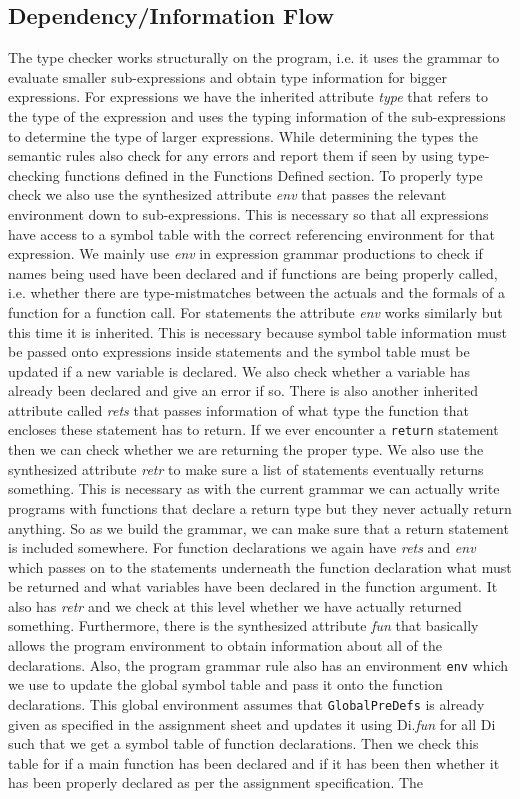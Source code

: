 \documentclass{article}
\begin{document}
\subsection{Dependency/Information Flow}
The type checker works structurally on the program, i.e. it uses the grammar to evaluate smaller sub-expressions and obtain type information for bigger expressions. For expressions we have the inherited attribute \textit{type} that refers to the type of the expression and uses the typing information of the sub-expressions to determine the type of larger expressions. While determining the types the semantic rules also check for any errors and report them if seen by using type-checking functions defined in the Functions Defined section. To properly type check we also use the synthesized attribute \textit{env} that passes the relevant environment down to sub-expressions. This is necessary so that all expressions have access to a symbol table with the correct referencing environment for that expression. We mainly use \textit{env} in expression grammar productions to check if names being used have been declared and if functions are being properly called, i.e. whether there are type-mistmatches between the actuals and the formals of a function for a function call. For statements the attribute \textit{env} works similarly but this time it is inherited. This is necessary because symbol table information must be passed onto expressions inside statements and the symbol table must be updated if a new variable is declared. We also check whether a variable has already been declared and give an error if so. There is also another inherited attribute called \textit{rets} that passes information of what type the function that encloses these statement has to return. If we ever encounter a \texttt{return} statement then we can check whether we are returning the proper type. We also use the synthesized attribute \textit{retr} to make sure a list of statements eventually returns something. This is necessary as with the current grammar we can actually write programs with functions that declare a return type but they never actually return anything. So as we build the grammar, we can make sure that a return statement is included somewhere. For function declarations we again have \textit{rets} and \textit{env} which passes on to the statements underneath the function declaration what must be returned and what variables have been declared in the function argument. It also has \textit{retr} and we check at this level whether we have actually returned something. Furthermore, there is the synthesized attribute \textit{fun} that basically allows the program environment to obtain information about all of the declarations. Also, the program grammar rule also has an environment \texttt{env} which we use to update the global symbol table and pass it onto the function declarations. This global environment assumes that \texttt{GlobalPreDefs} is already given as specified in the assignment sheet and updates it using Di.\textit{fun} for all Di such that we get a symbol table of function declarations. Then we check this table for if a main function has been declared and if it has been then whether it has been properly declared as per the assignment specification. The 
\end{document}
